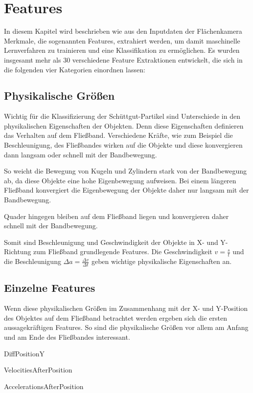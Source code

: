 \section{Features} \label{Features}
In diesem Kapitel wird beschrieben wie aus den Inputdaten der Flächenkamera Merkmale, die sogenannten Features, extrahiert werden, um damit maschinelle Lernverfahren zu trainieren und eine Klassifikation zu ermöglichen. Es wurden insgesamt mehr als 30 verschiedene Feature Extraktionen entwickelt, die sich in die folgenden vier Kategorien einordnen lassen:


\subsection{Physikalische Größen}
Wichtig für die Klassifizierung der Schüttgut-Partikel sind Unterschiede in den physikalischen Eigenschaften der Objekten. Denn diese Eigenschaften definieren das Verhalten auf dem Fließband. Verschiedene Kräfte, wie zum Beispiel die Beschleunigung, des Fließbandes wirken auf die Objekte und diese konvergieren dann langsam oder schnell mit der Bandbewegung.

So weicht die Bewegung von Kugeln und Zylindern stark von der Bandbewegung ab, da diese Objekte eine hohe Eigenbewegung aufweisen. Bei einem längeren Fließband konvergiert die Eigenbewegung der Objekte daher nur langsam mit der Bandbewegung.  

Quader hingegen bleiben auf dem Fließband liegen und konvergieren daher schnell mit der Bandbewegung. 

Somit sind Beschleunigung und Geschwindigkeit der Objekte in X- und Y-Richtung zum Fließband grundlegende Features. Die Geschwindigkeit \( v = \frac{s}{t} \) und die Beschleunigung \( \Delta a = \frac{\Delta v}{\Delta t} \) geben wichtige physikalische Eigenschaften an. 




\subsection{Einzelne Features}
Wenn diese physikalischen Größen im Zusammenhang mit der X- und Y-Position des Objektes auf dem Fließband betrachtet werden ergeben sich die ersten aussagekräftigen Features. So sind die physikalische Größen vor allem am Anfang und am Ende des Fließbandes interessant.

DiffPositionY

VelocitiesAfterPosition

AccelerationsAfterPosition





